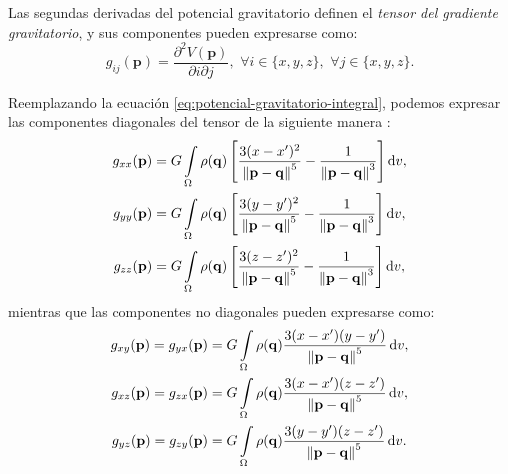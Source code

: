 Las segundas derivadas del potencial gravitatorio definen el \emph{tensor del
gradiente gravitatorio}, y sus componentes pueden expresarse como:
%
\begin{equation}
    g_{ij}(\mathbf{p}) =
        \frac{\partial^2 V(\mathbf{p})}{\partial i \partial j}, \,\,
        \forall i \in \{x, y, z\}, \,\,
        \forall j \in \{x, y, z\}.
\end{equation}

Reemplazando la ecuación \ref{eq:potencial-gravitatorio-integral}, podemos
expresar las componentes diagonales del tensor de la siguiente manera
\citep{grombein2013}:
%
\begin{align}
    g_{xx}(\mathbf{p}) &=
        G \int\limits_\Omega \rho(\mathbf{q})
        \left[
        \frac{3(x - x')^2}{\left\lVert \mathbf{p} - \mathbf{q} \right\rVert^5}
        - \frac{1}{\left\lVert \mathbf{p} - \mathbf{q} \right\rVert^3}
        \right]
        \mathop{}\!\textnormal{d} v,
    \label{eq:gxx-integral}
    \\
    g_{yy}(\mathbf{p}) &=
        G \int\limits_\Omega \rho(\mathbf{q})
        \left[
        \frac{3(y - y')^2}{\left\lVert \mathbf{p} - \mathbf{q} \right\rVert^5}
        - \frac{1}{\left\lVert \mathbf{p} - \mathbf{q} \right\rVert^3}
        \right]
        \mathop{}\!\textnormal{d} v,
    \label{eq:gyy-integral}
    \\
    g_{zz}(\mathbf{p}) &=
        G \int\limits_\Omega \rho(\mathbf{q})
        \left[
        \frac{3(z - z')^2}{\left\lVert \mathbf{p} - \mathbf{q} \right\rVert^5}
        - \frac{1}{\left\lVert \mathbf{p} - \mathbf{q} \right\rVert^3}
        \right]
        \mathop{}\!\textnormal{d} v,
    \label{eq:gzz-integral}
\end{align}
%
mientras que las componentes no diagonales pueden expresarse como:
%
\begin{align}
    g_{xy}(\mathbf{p}) =
    g_{yx}(\mathbf{p}) &=
        G \int\limits_\Omega \rho(\mathbf{q})
        \frac{
            3(x - x')(y - y')
        }{
            \left\lVert \mathbf{p} - \mathbf{q} \right\rVert^5
        }
        \mathop{}\!\textnormal{d} v,
    \label{eq:gxy-integral}
    \\
    g_{xz}(\mathbf{p}) =
    g_{zx}(\mathbf{p}) &=
        G \int\limits_\Omega \rho(\mathbf{q})
        \frac{
            3(x - x')(z - z')
        }{
            \left\lVert \mathbf{p} - \mathbf{q} \right\rVert^5
        }
        \mathop{}\!\textnormal{d} v,
    \label{eq:gxz-integral}
    \\
    g_{yz}(\mathbf{p}) =
    g_{zy}(\mathbf{p}) &=
        G \int\limits_\Omega \rho(\mathbf{q})
        \frac{
            3(y - y')(z - z')
        }{
            \left\lVert \mathbf{p} - \mathbf{q} \right\rVert^5
        }
        \mathop{}\!\textnormal{d} v.
    \label{eq:gyz-integral}
\end{align}

